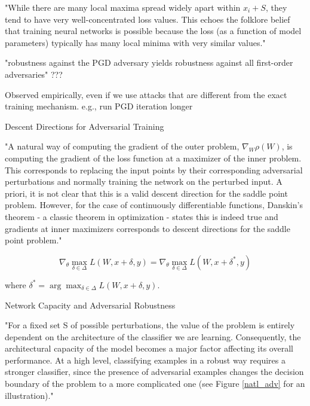 \documentclass[english]{article}
\begin{document}
\item "While there are many local maxima spread widely apart within
$x_i + S$, they tend to have very well-concentrated loss values. This echoes the folklore belief that
training neural networks is possible because the loss (as a function of model parameters) typically
has many local minima with very similar values."

\item "robustness against the PGD adversary yields
robustness against all first-order adversaries" ???

Observed empirically, even if we use attacks that are different from the exact training mechanism. e.g., run PGD iteration longer 

\item Descent Directions for Adversarial Training

"A natural way of computing the gradient of the outer problem,
$\nabla_W \rho(W)$, is computing the gradient of the loss function at a maximizer of the inner problem. This
corresponds to replacing the input points by their corresponding adversarial perturbations and
normally training the network on the perturbed input. A priori, it is not clear that this is a valid
descent direction for the saddle point problem. However, for the case of continuously differentiable
functions, Danskin's theorem - a classic theorem in optimization - states this is indeed true and
gradients at inner maximizers corresponds to descent directions for the saddle point problem."


$$\nabla_\theta \max_{\delta\in \Delta}
L(W,x+\delta,y)
= 
\nabla_\theta \max_{\delta\in \Delta}
L(W,x+\delta^*,y)
$$

where $\delta^* = \arg\max_{\delta\in \Delta}
L(W,x+\delta,y)$.

\item Network Capacity and Adversarial Robustness

"For a fixed set S of possible perturbations, the value of the problem is entirely dependent on the
architecture of the classifier we are learning. Consequently, the architectural capacity of the model
becomes a major factor affecting its overall performance. At a high level, classifying examples in
a robust way requires a stronger classifier, since the presence of adversarial examples changes the
decision boundary of the problem to a more complicated one (see Figure \ref{natl_adv} for an illustration)."
\end{document}
